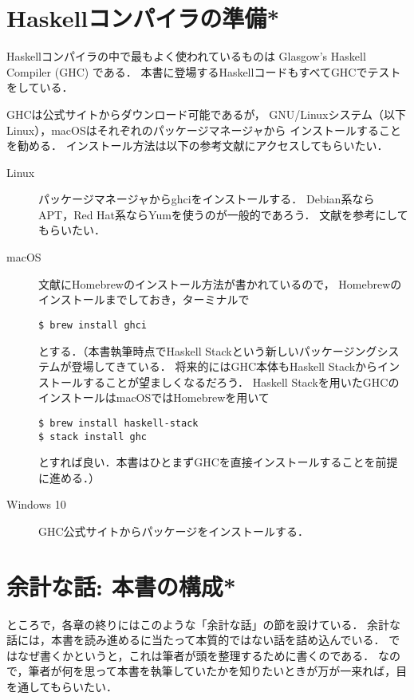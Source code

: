 \documentclass[a5paper,draft]{jsbook}
\newcommand{\programminglanguage}[1]{\textsf{#1}}
\newcommand{\haskell}{\programminglanguage{Haskell}}
\begin{document}

\section{\haskell コンパイラの準備*}

\haskell コンパイラの中で最もよく使われているものは Glasgow's Haskell Compiler (GHC) である．
本書に登場する\haskell コードもすべてGHCでテストをしている．

GHCは公式サイト\cite{haskellplatform}からダウンロード可能であるが，
GNU/Linuxシステム（以下Linux），macOSはそれぞれのパッケージマネージャから
インストールすることを勧める．
インストール方法は以下の参考文献にアクセスしてもらいたい．
\begin{description}
\item[Linux] パッケージマネージャからghciをインストールする．
Debian系ならAPT，Red Hat系ならYumを使うのが一般的であろう．
文献\cite{linux}を参考にしてもらいたい．
\item[macOS] 文献\cite{osx}にHomebrewのインストール方法が書かれているので，
Homebrewのインストールまでしておき，ターミナルで
\begin{verbatim}
$ brew install ghci
\end{verbatim}
とする．（本書執筆時点でHaskell Stackという新しいパッケージングシステムが登場してきている．
将来的にはGHC本体もHaskell Stackからインストールすることが望ましくなるだろう．
Haskell Stackを用いたGHCのインストールはmacOSではHomebrewを用いて
\begin{verbatim}
$ brew install haskell-stack
$ stack install ghc
\end{verbatim}
とすれば良い．本書はひとまずGHCを直接インストールすることを前提に進める．）
\item[Windows 10] GHC公式サイト\cite{haskellplatform}からパッケージをインストールする．
\end{description}

\section{余計な話: 本書の構成*}

ところで，各章の終りにはこのような「余計な話」の節を設けている．
余計な話には，本書を読み進めるに当たって本質的ではない話を詰め込んでいる．
ではなぜ書くかというと，これは筆者が頭を整理するために書くのである．
なので，筆者が何を思って本書を執筆していたかを知りたいときが万が一来れば，目を通してもらいたい．
\end{document}
